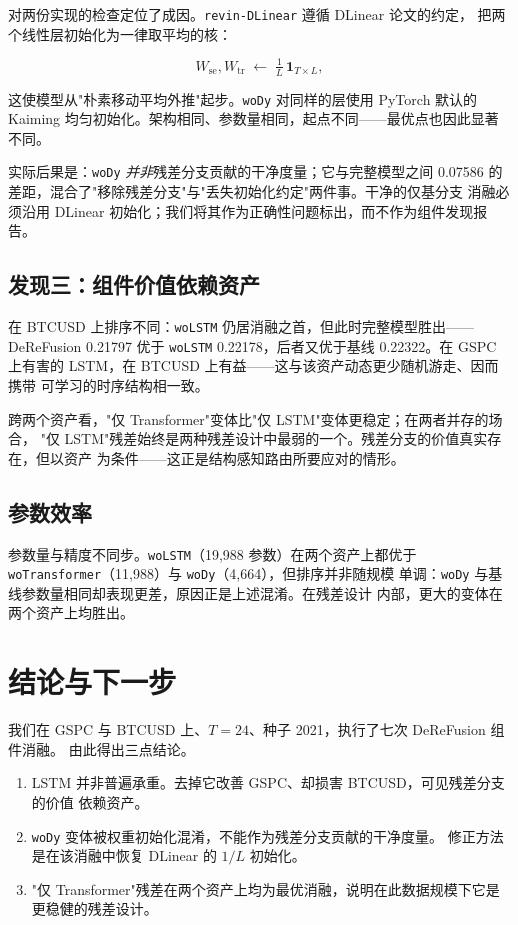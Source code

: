 \documentclass[11pt, a4paper]{ctexart}
\begin{document}
对两份实现的检查定位了成因。\texttt{revin-DLinear} 遵循 DLinear 论文的约定，
把两个线性层初始化为一律取平均的核：

\begin{equation}
W_{\text{se}}, W_{\text{tr}} \;\leftarrow\; \tfrac{1}{L}\,\mathbf{1}_{T\times L},
\end{equation}

这使模型从"朴素移动平均外推"起步。\texttt{woDy} 对同样的层使用 PyTorch 默认的
Kaiming 均匀初始化。架构相同、参数量相同，起点不同——最优点也因此显著不同。

实际后果是：\texttt{woDy} \emph{并非}残差分支贡献的干净度量；它与完整模型之间
0.07586 的差距，混合了"移除残差分支"与"丢失初始化约定"两件事。干净的仅基分支
消融必须沿用 DLinear 初始化；我们将其作为正确性问题标出，而不作为组件发现报告。

\subsection{发现三：组件价值依赖资产}
\label{sec:analysis-C}

在 BTCUSD 上排序不同：\texttt{woLSTM} 仍居消融之首，但此时完整模型胜出——
DeReFusion 0.21797 优于 \texttt{woLSTM} 0.22178，后者又优于基线 0.22322。在
GSPC 上有害的 LSTM，在 BTCUSD 上有益——这与该资产动态更少随机游走、因而携带
可学习的时序结构相一致。

跨两个资产看，"仅 Transformer"变体比"仅 LSTM"变体更稳定；在两者并存的场合，
"仅 LSTM"残差始终是两种残差设计中最弱的一个。残差分支的价值真实存在，但以资产
为条件——这正是结构感知路由所要应对的情形。

\subsection{参数效率}

参数量与精度不同步。\texttt{woLSTM}（19{,}988 参数）在两个资产上都优于
\texttt{woTransformer}（11{,}988）与 \texttt{woDy}（4{,}664），但排序并非随规模
单调：\texttt{woDy} 与基线参数量相同却表现更差，原因正是上述混淆。在残差设计
内部，更大的变体在两个资产上均胜出。

\section{结论与下一步}

我们在 GSPC 与 BTCUSD 上、$T{=}24$、种子 2021，执行了七次 DeReFusion 组件消融。
由此得出三点结论。

\begin{enumerate}
  \item LSTM 并非普遍承重。去掉它改善 GSPC、却损害 BTCUSD，可见残差分支的价值
        依赖资产。
  \item \texttt{woDy} 变体被权重初始化混淆，不能作为残差分支贡献的干净度量。
        修正方法是在该消融中恢复 DLinear 的 $1/L$ 初始化。
  \item "仅 Transformer"残差在两个资产上均为最优消融，说明在此数据规模下它是
        更稳健的残差设计。
\end{enumerate}
\end{document}
